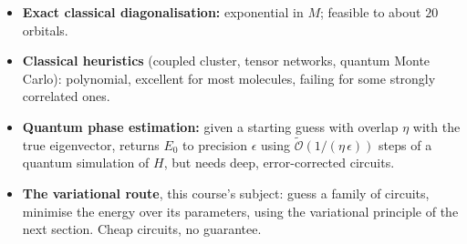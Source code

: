 \documentclass[handoutsbeamer.tex]{subfiles}
\begin{document}
\begin{frame}
\begin{itemize}\setlength\itemsep{0.25em}
    \item \textbf{Exact classical diagonalisation:} exponential in $M$; feasible to about $20$ orbitals.
    \item \textbf{Classical heuristics} (coupled cluster, tensor networks, quantum Monte Carlo): polynomial, excellent for most molecules, failing for some strongly correlated ones.
    \item \textbf{Quantum phase estimation:} given a starting guess with overlap $\eta$ with the true eigenvector, returns $E_0$ to precision $\epsilon$ using $\widetilde{\mathcal O}(1/(\eta\,\epsilon))$ steps of a quantum simulation of $H$, but needs deep, error-corrected circuits.
    \item \textbf{The variational route}, this course's subject: guess a family of circuits, minimise the energy over its parameters, using the variational principle of the next section. Cheap circuits, no guarantee.
\end{itemize}
\end{frame}
\end{document}
